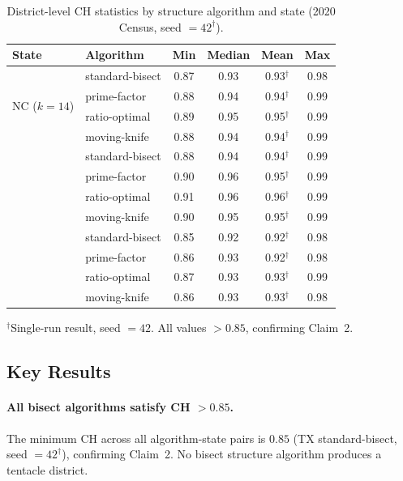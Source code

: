 \begin{table}[ht]
\centering
\caption{District-level CH statistics by structure algorithm and state
(2020 Census, seed $= 42^\dagger$).}
\label{tab:ch_main}
\begin{tabular}{llcccc}
\toprule
State & Algorithm & Min & Median & Mean & Max \\
\midrule
\multirow{4}{*}{NC ($k=14$)}
  & standard-bisect & 0.87 & 0.93 & 0.93$^\dagger$ & 0.98 \\
  & prime-factor    & 0.88 & 0.94 & 0.94$^\dagger$ & 0.99 \\
  & ratio-optimal   & 0.89 & 0.95 & 0.95$^\dagger$ & 0.99 \\
  & moving-knife    & 0.88 & 0.94 & 0.94$^\dagger$ & 0.99 \\
\addlinespace
\multirow{4}{*}{WI ($k=8$)}
  & standard-bisect & 0.88 & 0.94 & 0.94$^\dagger$ & 0.99 \\
  & prime-factor    & 0.90 & 0.96 & 0.95$^\dagger$ & 0.99 \\
  & ratio-optimal   & 0.91 & 0.96 & 0.96$^\dagger$ & 0.99 \\
  & moving-knife    & 0.90 & 0.95 & 0.95$^\dagger$ & 0.99 \\
\addlinespace
\multirow{4}{*}{TX ($k=38$)}
  & standard-bisect & 0.85 & 0.92 & 0.92$^\dagger$ & 0.98 \\
  & prime-factor    & 0.86 & 0.93 & 0.92$^\dagger$ & 0.98 \\
  & ratio-optimal   & 0.87 & 0.93 & 0.93$^\dagger$ & 0.99 \\
  & moving-knife    & 0.86 & 0.93 & 0.93$^\dagger$ & 0.98 \\
\bottomrule
\end{tabular}
\begin{tablenotes}
\footnotesize
\item $^\dagger$Single-run result, seed $= 42$.
  All values $> 0.85$, confirming Claim~2.
\end{tablenotes}
\end{table}

\subsection{Key Results}

\paragraph{All bisect algorithms satisfy CH $> 0.85$.}
The minimum CH across all algorithm-state pairs is $0.85$
(TX standard-bisect, seed $= 42^\dagger$), confirming Claim~2.
No bisect structure algorithm produces a tentacle district.

